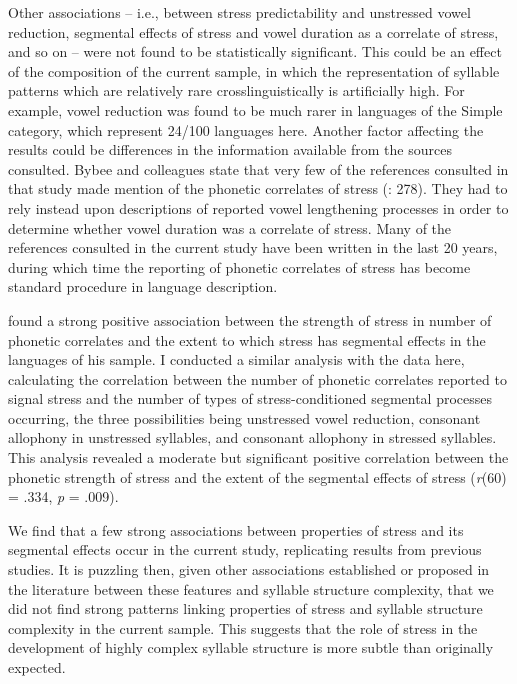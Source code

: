   Other associations -- i.e., between stress predictability and unstressed vowel reduction, segmental effects of stress and vowel duration as a correlate of stress, and so on -- were not found to be statistically significant. This could be an effect of the composition of the current sample, in which the representation of syllable patterns which are relatively rare crosslinguistically is artificially high. For example, vowel reduction was found to be much rarer in languages of the Simple category, which represent 24/100 languages here. Another factor affecting the results could be differences in the information available from the sources consulted. Bybee and colleagues state that very few of the references consulted in that study made mention of the phonetic correlates of stress (\citeyear{BybeeEtAl1998}: 278). They had to rely instead upon descriptions of reported vowel lengthening processes in order to determine whether vowel duration was a correlate of stress. Many of the references consulted in the current study have been written in the last 20 years, during which time the reporting of phonetic correlates of stress has become standard procedure in language description.

  \citet{Schiering2007} found a strong positive association between the strength of stress in number of phonetic correlates and the extent to which stress has segmental effects in the languages of his sample. I conducted a similar analysis with the data here, calculating the correlation between the number of phonetic correlates reported to signal stress and the number of types of stress-conditioned segmental processes occurring, the three possibilities being unstressed vowel reduction, consonant allophony in unstressed syllables, and consonant allophony in stressed syllables. This analysis revealed a moderate but significant positive correlation between the phonetic strength of stress and the extent of the segmental effects of stress (\textit{r}(60) = .334, \textit{p} = .009).

  We find that a few strong associations between properties of stress and its segmental effects occur in the current study, replicating results from previous studies. It is puzzling then, given other associations established or proposed in the literature between these features and syllable structure complexity, that we did not find strong patterns linking properties of stress and syllable structure complexity in the current sample. This suggests that the role of stress in the development of highly complex syllable structure is more subtle than originally expected.

